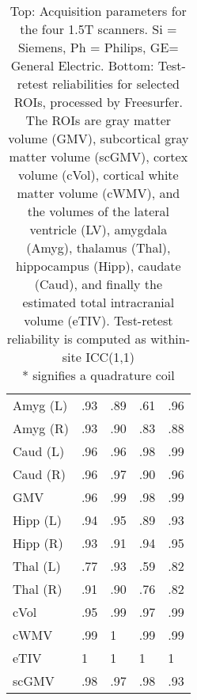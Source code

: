 \begin{table}
\begin{tabular}{lllll}
Amyg (L)              &               .93 &               .89 &                 .61 &                 .96 \\
Amyg (R)              &               .93 &               .90 &                 .83 &                 .88 \\
Caud (L)              &               .96 &               .96 &                 .98 &                 .99 \\
Caud (R)              &               .96 &               .97 &                 .90 &                 .96 \\
GMV                   &               .96 &               .99 &                 .98 &                 .99 \\
Hipp (L)              &               .94 &               .95 &                 .89 &                 .93 \\
Hipp (R)              &               .93 &               .91 &                 .94 &                 .95 \\
Thal (L)              &               .77 &               .93 &                 .59 &                 .82 \\
Thal (R)              &               .91 &               .90 &                 .76 &                 .82 \\
cVol                  &               .95 &               .99 &                 .97 &                 .99 \\
cWMV                  &               .99 &               1 &                 .99 &                 .99 \\
eTIV                  &               1 &               1 &                 1 &                 1 \\
scGMV                 &               .98 &               .97 &                 .98 &                 .93 \\
\bottomrule
\end{tabular}
\caption{Top: Acquisition parameters for the four 1.5T scanners. Si = Siemens, Ph = Philips, GE= General Electric. Bottom: Test-retest reliabilities for selected ROIs, processed by Freesurfer. The ROIs are gray matter volume (GMV), subcortical gray matter volume (scGMV), cortex volume (cVol), cortical white matter volume (cWMV), and the volumes of the lateral ventricle (LV), amygdala (Amyg), thalamus (Thal), hippocampus (Hipp), caudate (Caud), and finally the estimated total intracranial volume (eTIV). Test-retest reliability is computed as within-site ICC(1,1) \\ * signifies a quadrature coil} 
\label{tab:acquisition1}

\end{table}